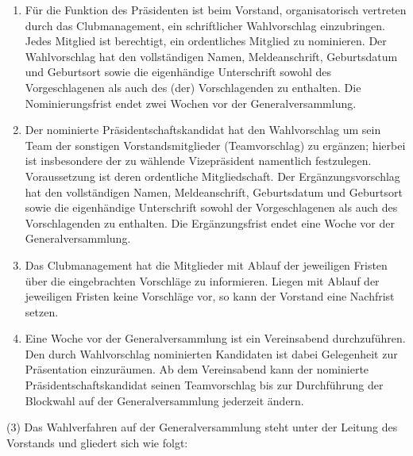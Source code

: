 \documentclass[10pt,a4paper]{article}
\begin{document}
\begin{enumerate}[label=\alph*)]
\item
Für die Funktion des Präsidenten ist beim Vorstand, organisatorisch vertreten durch das Clubmanagement, ein schriftlicher Wahlvorschlag einzubringen.
Jedes Mitglied ist berechtigt, ein ordentliches Mitglied zu nominieren.
Der Wahlvorschlag hat den vollständigen Namen, Meldeanschrift, Geburtsdatum und Geburtsort sowie die eigenhändige Unterschrift sowohl des Vorgeschlagenen als auch des (der) Vorschlagenden zu enthalten.
Die Nominierungsfrist endet zwei Wochen vor der Generalversammlung.
\item
Der nominierte Präsidentschaftskandidat hat den Wahlvorschlag um sein Team der sonstigen Vorstandsmitglieder (Teamvorschlag) zu ergänzen;
hierbei ist insbesondere der zu wählende Vizepräsident namentlich festzulegen.
Voraussetzung ist deren ordentliche Mitgliedschaft.
Der Ergänzungsvorschlag hat den vollständigen Namen, Meldeanschrift, Geburtsdatum und Geburtsort sowie die eigenhändige Unterschrift sowohl der Vorgeschlagenen als auch des Vorschlagenden zu enthalten.
Die Ergänzungsfrist endet eine Woche vor der Generalversammlung.
\item
Das Clubmanagement hat die Mitglieder mit Ablauf der jeweiligen Fristen über die eingebrachten Vorschläge zu informieren.
Liegen mit Ablauf der jeweiligen Fristen keine Vorschläge vor, so kann der Vorstand eine Nachfrist setzen.
\item
Eine Woche vor der Generalversammlung ist ein Vereinsabend durchzuführen.
Den durch Wahlvorschlag nominierten Kandidaten ist dabei Gelegenheit zur Präsentation einzuräumen.
Ab dem Vereinsabend kann der nominierte Präsidentschaftskandidat seinen Teamvorschlag bis zur Durchführung der Blockwahl auf der Generalversammlung jederzeit ändern.
\end{enumerate}

(3)
Das Wahlverfahren auf der Generalversammlung steht unter der Leitung des Vorstands und gliedert sich wie folgt:
\end{document}
